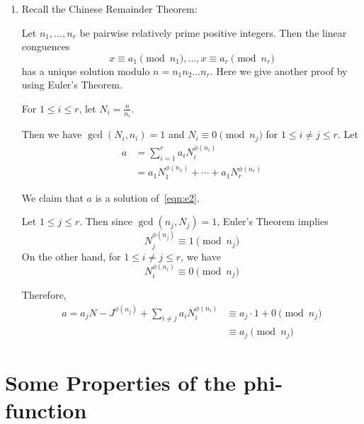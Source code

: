 \begin{eg}
\begin{enumerate}
        \item Recall the Chinese Remainder Theorem:
        
        Let $n_1, \dots, n_r$ be pairwise relatively prime positive integers. 
        Then the linear conguences
        \[
            \tag{*}
            x \equiv a_1 \pmod{n_1}, \dots, x \equiv a_r \pmod{n_r}
            \label{eqn:e2}
        \]
        has a unique solution modulo $n = n_1 n_2 \dots n_r$.
        Here we give another proof by using Euler's Theorem.

        For $1 \leq i \leq r$, let $N_i = \frac{n}{n_i}$. 
        
        Then we have $\gcd(N_i, n_i) = 1$ and 
        $N_i \equiv 0 \pmod{n_j}$ for $1 \leq i \neq j \leq r$.
        Let
        \[
            \begin{aligned}
                a &= \sum_{i=1}^{r}{a_i N_i^{\phi(n_i)}} \\
                &= a_1 N_1^{\phi(n_1)} + \cdots + a_1 N_r^{\phi(n_r)}
            \end{aligned}
        \]

        We claim that $a$ is a solution of~\eqref{eqn:e2}.

        Let $1 \leq j \leq r$. Then since $\gcd(n_j, N_j) = 1$, Euler's Theorem implies
        \[
            N_j^{\phi(n_j)} \equiv 1 \pmod{n_j}
        \]
        On the other hand, for $1 \leq i \neq j \leq r$, we have
        \[
            N_i^{\phi(n_i)} \equiv 0 \pmod{n_j}
        \]

        Therefore,
        \[
            \begin{aligned}
                a = a_j N-J^{\phi(n_j)} + \sum_{i \neq j}^{}{a_i N_i^{\phi(n_i)}} &\equiv a_j \cdot 1 + 0 \pmod{n_j} \\
                &\equiv a_j \pmod n_j
            \end{aligned}
        \]
    \end{enumerate}
\end{eg}

\section{Some Properties of the phi-function}

